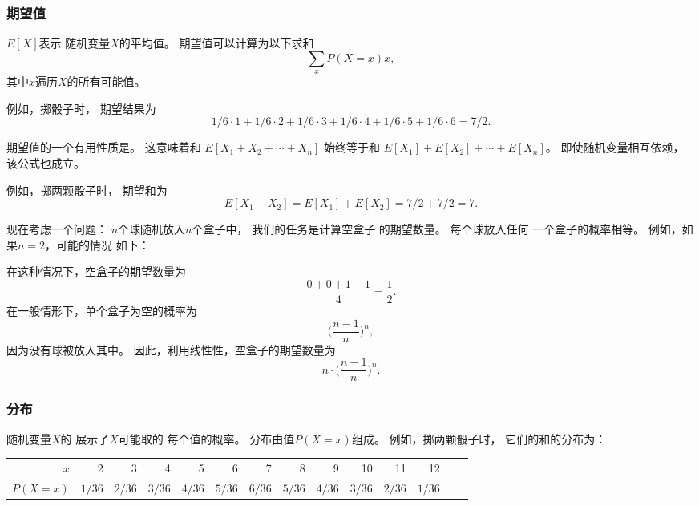 \subsubsection{期望值}


$E[X]$表示
随机变量$X$的平均值。
期望值可以计算为以下求和
\[\sum_x P(X=x)x,\]
其中$x$遍历$X$的所有可能值。

例如，掷骰子时，
期望结果为
\[1/6 \cdot 1 + 1/6 \cdot 2 + 1/6 \cdot 3 + 1/6 \cdot 4 + 1/6 \cdot 5 + 1/6 \cdot 6 = 7/2.\]

期望值的一个有用性质是。
这意味着和
$E[X_1+X_2+\cdots+X_n]$
始终等于和
$E[X_1]+E[X_2]+\cdots+E[X_n]$。
即使随机变量相互依赖，
该公式也成立。

例如，掷两颗骰子时，
期望和为
\[E[X_1+X_2]=E[X_1]+E[X_2]=7/2+7/2=7.\]

现在考虑一个问题：
$n$个球随机放入$n$个盒子中，
我们的任务是计算空盒子
的期望数量。
每个球放入任何
一个盒子的概率相等。
例如，如果$n=2$，可能的情况
如下：
\begin{center}
\end{center}
在这种情况下，空盒子的期望数量为
\[\frac{0+0+1+1}{4} = \frac{1}{2}.\]
在一般情形下，单个盒子为空的概率为
\[\Big(\frac{n-1}{n}\Big)^n,\]
因为没有球被放入其中。
因此，利用线性性，空盒子的期望数量为
\[n \cdot \Big(\frac{n-1}{n}\Big)^n.\]

\subsubsection{分布}


随机变量$X$的
展示了$X$可能取的
每个值的概率。
分布由值$P(X=x)$组成。
例如，掷两颗骰子时，
它们的和的分布为：
\begin{center}
\small {
\begin{tabular}{r|rrrrrrrrrrrrr}
$x$ & 2 & 3 & 4 & 5 & 6 & 7 & 8 & 9 & 10 & 11 & 12 \\
$P(X=x)$ & $1/36$ & $2/36$ & $3/36$ & $4/36$ & $5/36$ & $6/36$ & $5/36$ & $4/36$ & $3/36$ & $2/36$ & $1/36$ \\
\end{tabular}
}
\end{center}


